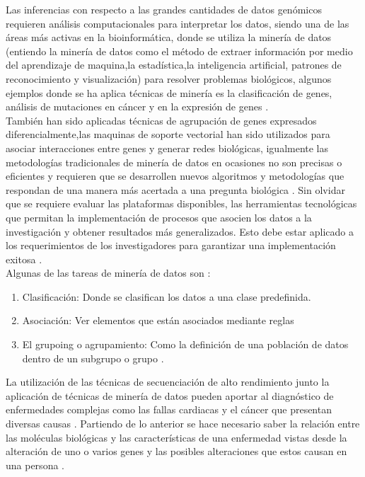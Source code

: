 {Las inferencias con respecto a las grandes cantidades de datos genómicos requieren análisis computacionales para interpretar los datos, siendo una de las áreas más activas en la bioinformática, donde se utiliza la minería de datos (entiendo la minería de datos como el método de extraer información por medio del aprendizaje de maquina,la estadística,la inteligencia artificial, patrones de reconocimiento y visualización) para resolver problemas biológicos, algunos ejemplos donde se ha aplica técnicas de minería es la clasificación de genes, análisis de mutaciones en cáncer y en la expresión de genes \cite{Littlefield}. \\

También han sido aplicadas técnicas de agrupación de genes expresados diferencialmente,las maquinas de soporte vectorial han sido utilizados para asociar interacciones entre genes y generar redes biológicas, igualmente las metodologías tradicionales de minería de datos en ocasiones no son precisas o eficientes y requieren que se desarrollen nuevos algoritmos y metodologías que respondan de una manera más acertada a una pregunta biológica \cite{Zaki2007}. Sin olvidar que se requiere evaluar las plataformas disponibles, las herramientas tecnológicas que permitan  la implementación de procesos que asocien los datos a  la investigación  y obtener resultados más generalizados.  Esto debe estar aplicado a los requerimientos de los investigadores para garantizar una implementación exitosa \cite{Bustos2007,Zaki2007}.\\

Algunas de las tareas de minería de datos son \cite{Littlefield}:

\begin{enumerate}[1.]
	\item Clasificación: Donde se clasifican los datos a una clase predefinida.
	\item Asociación: Ver elementos que están asociados mediante reglas
	\item El grupoing o agrupamiento: Como la definición de una población de datos dentro de un subgrupo o grupo .
\end{enumerate}

La utilización de las técnicas de secuenciación de alto rendimiento junto  la aplicación de técnicas de minería de datos pueden aportar al diagnóstico de enfermedades complejas  como las fallas cardiacas y el cáncer que presentan diversas causas \cite{Hannah-Shmouni2015} . Partiendo de lo anterior se hace necesario saber la relación entre las moléculas biológicas y las características de una enfermedad vistas desde la alteración de uno o varios genes y las posibles alteraciones que estos causan en una persona \cite{Li2014}.

}
